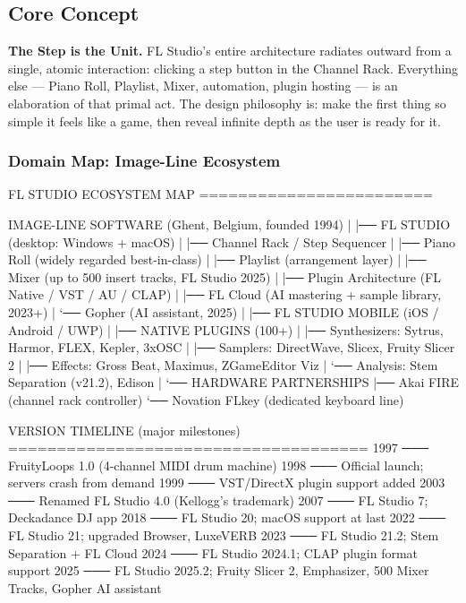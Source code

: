 \documentclass[11pt,letterpaper]{article}
\begin{document}
\subsection{Core Concept}

\textbf{The Step is the Unit.} FL Studio's entire architecture radiates outward from a single, atomic interaction: clicking a step button in the Channel Rack. Everything else --- Piano Roll, Playlist, Mixer, automation, plugin hosting --- is an elaboration of that primal act. The design philosophy is: make the first thing so simple it feels like a game, then reveal infinite depth as the user is ready for it.

\subsubsection{Domain Map: Image-Line Ecosystem}

\begin{asciibox}
FL STUDIO ECOSYSTEM MAP
========================

  IMAGE-LINE SOFTWARE (Ghent, Belgium, founded 1994)
  |
  |── FL STUDIO (desktop: Windows + macOS)
  |    |── Channel Rack / Step Sequencer
  |    |── Piano Roll (widely regarded best-in-class)
  |    |── Playlist (arrangement layer)
  |    |── Mixer (up to 500 insert tracks, FL Studio 2025)
  |    |── Plugin Architecture (FL Native / VST / AU / CLAP)
  |    |── FL Cloud (AI mastering + sample library, 2023+)
  |    `── Gopher (AI assistant, 2025)
  |
  |── FL STUDIO MOBILE (iOS / Android / UWP)
  |
  |── NATIVE PLUGINS (100+)
  |    |── Synthesizers: Sytrus, Harmor, FLEX, Kepler, 3xOSC
  |    |── Samplers:    DirectWave, Slicex, Fruity Slicer 2
  |    |── Effects:     Gross Beat, Maximus, ZGameEditor Viz
  |    `── Analysis:    Stem Separation (v21.2), Edison
  |
  `── HARDWARE PARTNERSHIPS
       |── Akai FIRE (channel rack controller)
       `── Novation FLkey (dedicated keyboard line)

VERSION TIMELINE (major milestones)
=====================================
  1997 ─── FruityLoops 1.0 (4-channel MIDI drum machine)
  1998 ─── Official launch; servers crash from demand
  1999 ─── VST/DirectX plugin support added
  2003 ─── Renamed FL Studio 4.0 (Kellogg's trademark)
  2007 ─── FL Studio 7; Deckadance DJ app
  2018 ─── FL Studio 20; macOS support at last
  2022 ─── FL Studio 21; upgraded Browser, LuxeVERB
  2023 ─── FL Studio 21.2; Stem Separation + FL Cloud
  2024 ─── FL Studio 2024.1; CLAP plugin format support
  2025 ─── FL Studio 2025.2; Fruity Slicer 2, Emphasizer,
           500 Mixer Tracks, Gopher AI assistant
\end{asciibox}
\end{document}
